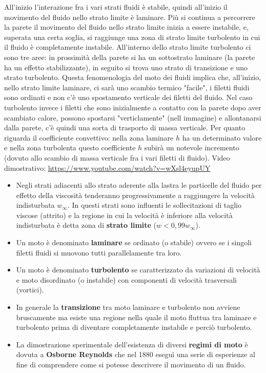 \newline
All'inizio l'interazione fra i vari strati fluidi è stabile, quindi all'inizio il movimento del fluido nello strato limite è laminare. Più si continua a percorrere la parete il movimento del fluido nello strato limite inizia a essere instabile, e, superata una certa soglia, si raggiunge una zona di strato limite turbolento in cui il fluido è completamente instabile. All'interno dello strato limite turbolento ci sono tre aree: in prossimità della parete si ha un sottostrato laminare (la parete ha un effetto stabilizzante), in seguito si trova uno strato di transizione e uno strato turbolento.\newline
\newline
Questa fenomenologia del moto dei fluidi implica che, all'inizio, nello strato limite laminare, ci sarà uno scambio termico "facile", i filetti fluidi sono ordinati e non c'è uno spostamento verticale dei filetti del fluido. Nel caso turbolento invece i filetti che sono inizialmente a contatto con la parete dopo aver scambiato calore, possono spostarsi "verticlamente" (nell immagine) e allontanarsi dalla parete, c'è quindi una sorta di trasporto di massa verticale.\newline
\newline
Per quanto riguarda il coefficiente convettivo: nella zona laminare $h$ ha un determinato valore e nella zona turbolenta questo coefficiente $h$ subirà un notevole incremento (dovuto allo scambio di massa verticale fra i vari filetti di fluido).\newline
\newline
Video dimostrativo: \url{https://www.youtube.com/watch?v=wXsl4eyupUY}
\newline
\begin{itemize}
    \item Negli strati adiacenti allo strato aderente alla lastra le particelle del fluido per
    effetto della viscosità tenderanno progressivamente a raggiungere la velocità
    indisturbata $w_{\infty}$. In questi strati sono influenti le sollecitazioni di taglio viscose
    (attrito) e la regione in cui la velocità è inferiore alla velocità indisturbata è
    detta zona di \textbf{strato limite} ($w < 0,99 w_{\infty}$).
    \item Un moto è denominato \textbf{laminare} se ordinato (o stabile) ovvero se i singoli filetti fluidi si muovono tutti parallelamente tra loro.
    \item Un moto è denominato \textbf{turbolento} se caratterizzato da variazioni di velocità e moto disordinato (o instabile) con componenti di velocità trasversali (vortici).
    \item In generale la \textbf{transizione} tra moto laminare e turbolento non avviene bruscamente ma esiste una regione nella quale il moto fluttua tra laminare e turbolento prima di diventare completamente instabile e perciò turbolento.
    \item La dimostrazione sperimentale dell'esistenza di diversi \textbf{regimi di moto} è dovuta a \textbf{Osborne Reynolds} che nel 1880 eseguì una serie di esperienze al fine di comprendere come si potesse descrivere il movimento di un fluido.
\end{itemize}
